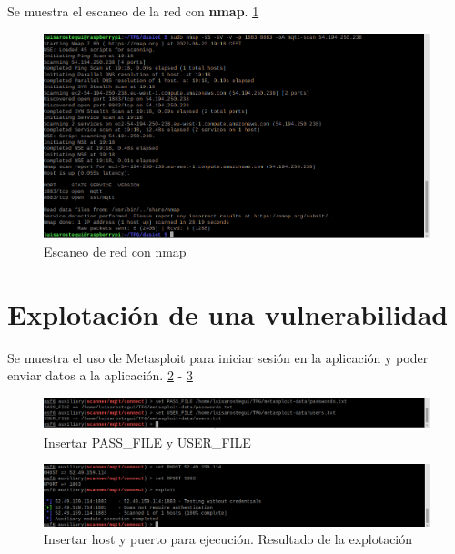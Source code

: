 Se muestra el escaneo de la red con \textbf{nmap}. \ref{fig:figure19-prueba}

\begin{figure}[p]
    \centering
    \includegraphics[width=\linewidth]{imagenes/2022-06-20-191838_1920x1080_scrot.png}
    \caption{Escaneo de red con nmap}
    \label{fig:figure19-prueba}
\end{figure}


\section{Explotación de una vulnerabilidad}

Se muestra el uso de Metasploit para iniciar sesión en la aplicación y poder enviar datos a la aplicación. \ref{fig:figure22-prueba} - \ref{fig:figure22.2-prueba} \\

\begin{figure}[p]
    \centering
    \includegraphics[width=\linewidth]{imagenes/2022-06-14-180947_1920x1080_scrot.png}
    \caption{Insertar PASS\_FILE y USER\_FILE}
    \label{fig:figure22-prueba}
\end{figure}

\begin{figure}[p]
    \centering
    \includegraphics[width=\linewidth]{imagenes/2022-06-14-183011_1920x1080_scrot.png}
    \caption{Insertar host y puerto para ejecución. Resultado de la explotación}
    \label{fig:figure22.2-prueba}
\end{figure}

